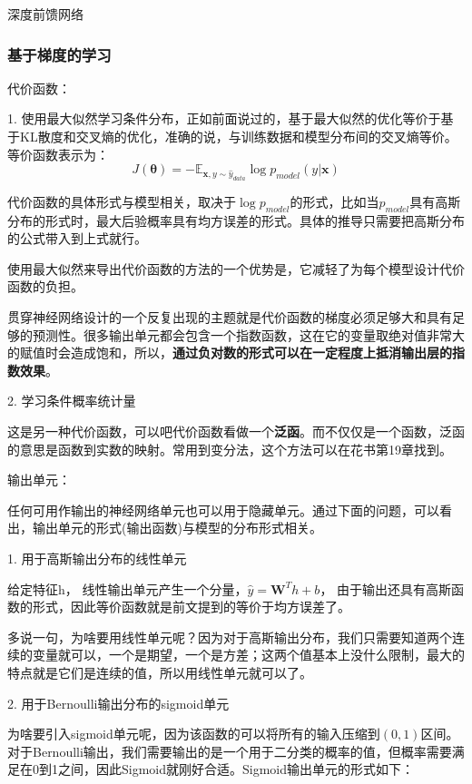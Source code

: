 深度前馈网络

\subsubsection{基于梯度的学习}

代价函数：

1. 使用最大似然学习条件分布，正如前面说过的，基于最大似然的优化等价于基于KL散度和交叉熵的优化，准确的说，与训练数据和模型分布间的交叉熵等价。等价函数表示为：
\begin{displaymath}
J(\mathbf{\theta}) = - \mathbb{E}_{\mathbf{x}, y \sim \hat{y}_{data}} \log p_{model}(y | \mathbf{x})
\end{displaymath}

代价函数的具体形式与模型相关，取决于$\log p_{model}$的形式，比如当$p_{model}$具有高斯分布的形式时，最大后验概率具有均方误差的形式。具体的推导只需要把高斯分布的公式带入到上式就行。

使用最大似然来导出代价函数的方法的一个优势是，它减轻了为每个模型设计代价函数的负担。

贯穿神经网络设计的一个反复出现的主题就是代价函数的梯度必须足够大和具有足够的预测性。很多输出单元都会包含一个指数函数，这在它的变量取绝对值非常大的赋值时会造成饱和，所以，\textbf{通过负对数的形式可以在一定程度上抵消输出层的指数效果}。

2. 学习条件概率统计量

这是另一种代价函数，可以吧代价函数看做一个\textbf{泛函}。而不仅仅是一个函数，泛函的意思是函数到实数的映射。常用到变分法，这个方法可以在花书第19章找到。

输出单元：

任何可用作输出的神经网络单元也可以用于隐藏单元。通过下面的问题，可以看出，输出单元的形式(输出函数)与模型的分布形式相关。

1. 用于高斯输出分布的线性单元

给定特征h， 线性输出单元产生一个分量，$\hat{y}=\mathbf{W}^T h + b$， 由于输出还具有高斯函数的形式，因此等价函数就是前文提到的等价于均方误差了。

多说一句，为啥要用线性单元呢？因为对于高斯输出分布，我们只需要知道两个连续的变量就可以，一个是期望，一个是方差；这两个值基本上没什么限制，最大的特点就是它们是连续的值，所以用线性单元就可以了。

2. 用于Bernoulli输出分布的sigmoid单元

为啥要引入sigmoid单元呢，因为该函数的可以将所有的输入压缩到$(0, 1)$区间。对于Bernoulli输出，我们需要输出的是一个用于二分类的概率的值，但概率需要满足在0到1之间，因此Sigmoid就刚好合适。Sigmoid输出单元的形式如下：

